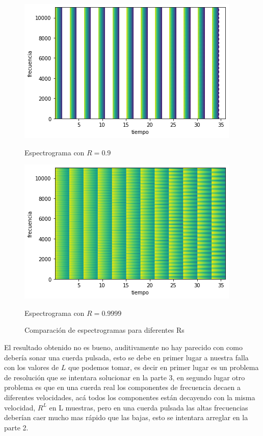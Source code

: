 \documentclass[a4paper]{article}
\begin{document}
\begin{figure}[h]
\begin{minipage}[b]{0.5\linewidth}
\centering
\includegraphics[width=\linewidth]{09.png}
\caption{Espectrograma con $R=0.9$}
\label{09}
\end{minipage}
\hspace{0.5cm}
\begin{minipage}[b]{0.5\linewidth}
\centering
\includegraphics[width=\linewidth]{09999.png}
\caption{Espectrograma con $R=0.9999$}
\label{094}
\end{minipage}
\caption{Comparación de espectrogramas para diferentes Rs}
\label{comparacion1}
\end{figure}

\newline
El resultado obtenido no es bueno, auditivamente no hay parecido con como debería sonar una cuerda pulsada, esto se debe en primer lugar a nuestra falla con los valores de $L$ que podemos tomar, es decir en primer lugar es un problema de resolución que se intentara solucionar en la parte 3, en segundo lugar otro problema es que en una cuerda real los componentes de frecuencia decaen a diferentes velocidades, acá todos los componentes están decayendo con la misma velocidad, $R^L$ en L muestras, pero en una cuerda pulsada las altas frecuencias deberían caer mucho mas rápido que las bajas, esto se intentara arreglar en la parte 2. 
\end{document}
